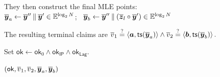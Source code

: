 \begin{algorithm}[!t]
They then construct the final MLE points:\\
\Indp
\(
    \overline{\bm y}_a
    \leftarrow
    \overline{\bm y}''
    \mathbin{\|}
    \overline{\bm y}'\in\mathbb{E}^{\log_2N}
\);~
\(
    \overline{\bm y}_b
    \leftarrow
    \overline{\bm y}''
    \mathbin{\|}
    \left(
        \overline{\bm z}_l
        \circ
        \overline{\bm y}'
    \right)\in\mathbb{E}^{\log_2N}
\)\;
\Indm

The resulting terminal claims are
\(
    \overline{v}_1
    \mathrel{\overset{\mathrm{?}}{=}}
    \left\langle
        \bm a,
        {\sf ts}(\overline{\bm y}_a)
    \right\rangle
    \wedge
    \overline{v}_2
    \mathrel{\overset{\mathrm{?}}{=}}
    \left\langle
        \bm b,
        {\sf ts}(\overline{\bm y}_b)
    \right\rangle.
\)\;

Set
\(
    \mathsf{ok}
    \leftarrow
    \mathsf{ok}_0
    \wedge
    \mathsf{ok}_{\mathsf{IP}}
    \wedge
    \mathsf{ok}_{\mathsf{Lag}}.
\)

\Return
\(
    (
        \mathsf{ok},
        \overline{v}_1,
        \overline{v}_2,
        \overline{\bm y}_a,
        \overline{\bm y}_b
    )
\)\;
\end{algorithm}
